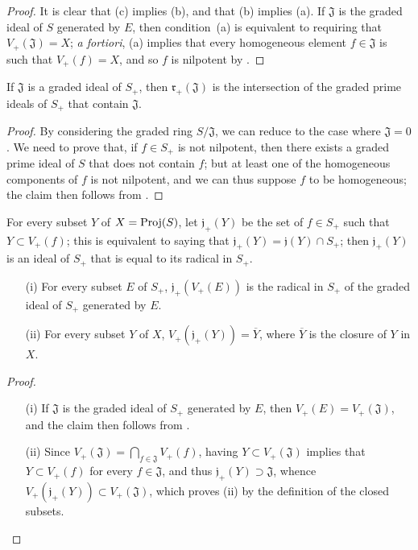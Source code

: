 \begin{proof}
It is clear that (c) implies (b), and that (b) implies (a).
If $\mathfrak{J}$ is the graded ideal of $S$ generated by $E$, then condition~(a) is equivalent to requiring that $V_+(\mathfrak{J})=X$;
\emph{a fortiori}, (a) implies that every homogeneous element $f\in\mathfrak{J}$ is such that $V_+(f)=X$, and so $f$ is nilpotent by .
\end{proof}

\begin{corollary}[2.3.9]
\label{II.2.3.9}
If $\mathfrak{J}$ is a graded ideal of $S_+$, then $\mathfrak{r}_+(\mathfrak{J})$ is the intersection of the graded prime ideals of $S_+$ that contain $\mathfrak{J}$.
\end{corollary}

\begin{proof}
By considering the graded ring $S/\mathfrak{J}$, we can reduce to the case where $\mathfrak{J}=0$.
We need to prove that, if $f\in S_+$ is not nilpotent, then there exists a graded prime ideal of $S$ that does not contain $f$;
but at least one of the homogeneous components of $f$ is not nilpotent, and we can thus suppose $f$ to be homogeneous;
the claim then follows from .
\end{proof}

\begin{env}[2.3.10]
\label{II.2.3.10}
For every subset $Y$ of $X=\operatorname{Proj}(S)$, let $\mathfrak{j}_+(Y)$ be the set of $f\in S_+$ such that $Y\subset V_+(f)$;
this is equivalent to saying that $\mathfrak{j}_+(Y)=\mathfrak{j}(Y)\cap S_+$;
then $\mathfrak{j}_+(Y)$ is an ideal of $S_+$ that is equal to its radical in $S_+$.
\end{env}

\begin{proposition}[2.3.11]
\label{II.2.3.11}
\begin{enumerate}
  \item[{\rm(i)}] For every subset $E$ of $S_+$, $\mathfrak{j}_+(V_+(E))$ is the radical in $S_+$ of the graded ideal of $S_+$ generated by $E$.
  \item[{\rm(ii)}] For every subset $Y$ of $X$, $V_+(\mathfrak{j}_+(Y))=\overline{Y}$, where $\overline{Y}$ is the closure of $Y$ in $X$.
\end{enumerate}
\end{proposition}

\begin{proof}
\begin{enumerate}
  \item[{\rm(i)}] If $\mathfrak{J}$ is the graded ideal of $S_+$ generated by $E$, then $V_+(E)=V_+(\mathfrak{J})$, and the claim then follows from .
  \item[{\rm(ii)}] Since $V_+(\mathfrak{J})=\bigcap_{f\in\mathfrak{J}}V_+(f)$, having $Y\subset V_+(\mathfrak{J})$ implies that $Y\subset V_+(f)$ for every $f\in\mathfrak{J}$, and thus $\mathfrak{j}_+(Y)\supset\mathfrak{J}$, whence $V_+(\mathfrak{j}_+(Y))\subset V_+(\mathfrak{J})$, which proves (ii) by the definition of the closed subsets.
\end{enumerate}
\end{proof}


